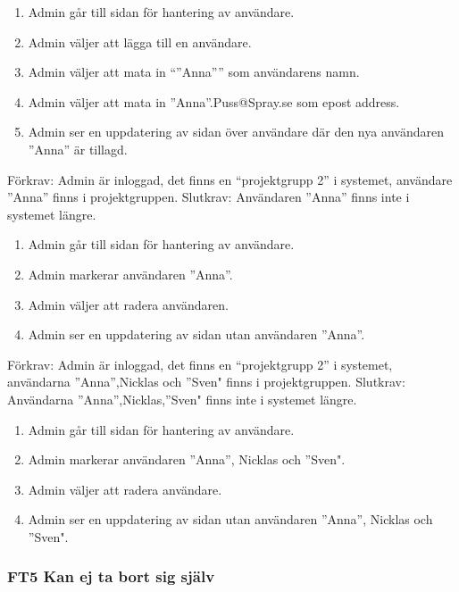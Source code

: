 \documentclass[paper=a4, fontsize=11pt,twoside]{article}
\begin{document}
	\begin{enumerate}
	  \item Admin går till sidan för hantering av användare.
	  \item Admin väljer att lägga till en användare.
	  \item Admin väljer att mata in “”Anna”” som användarens namn.
	  \item Admin väljer att mata in  ”Anna”.Puss@Spray.se som epost address.
		\item Admin ser en uppdatering av sidan över användare där den nya användaren
		”Anna” är tillagd.
	\end{enumerate}
	
	Förkrav: Admin är inloggad, det finns en “projektgrupp 2” i systemet, användare 
	”Anna” finns i projektgruppen.
	\newline
	Slutkrav: Användaren ”Anna” finns inte i systemet längre.
	
	\begin{enumerate}
	 \item Admin går till sidan för hantering av användare.
   \item Admin markerar användaren ”Anna”.
   \item Admin väljer att radera användaren.
   \item Admin ser en uppdatering av sidan utan användaren ”Anna”.
	  
	\end{enumerate}
	
	Förkrav: Admin är inloggad, det finns en “projektgrupp 2” i systemet, användarna 
	”Anna”,Nicklas och ”Sven" finns i projektgruppen.
	\newline
	Slutkrav: Användarna ”Anna”,Nicklas,”Sven" finns inte i systemet längre.
	
	\begin{enumerate}
	\item  Admin går till sidan för hantering av användare.
    \item Admin markerar användaren ”Anna”, Nicklas och ”Sven".
    \item Admin väljer att radera användare.
    \item Admin ser en uppdatering av sidan utan användaren ”Anna”, Nicklas och
  ”Sven".
	  
	\end{enumerate}
	
	
	
	\subsubsection*{FT5 Kan ej ta bort sig själv }
	
\end{document}
